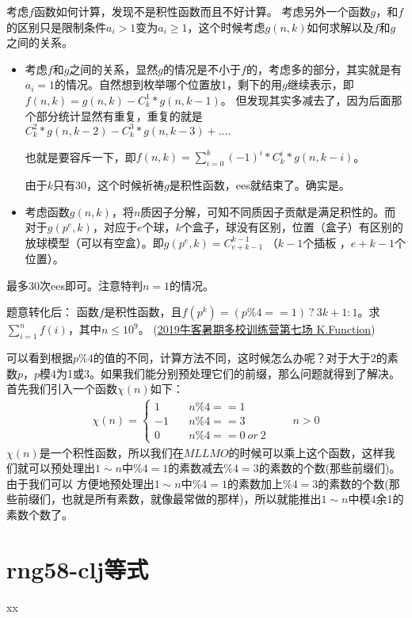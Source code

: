 \begin{solution}
	考虑$f$函数如何计算，发现不是积性函数而且不好计算。
	考虑另外一个函数$g$，和$f$的区别只是限制条件$a_i>1$变为$a_i\ge 1$，这个时候考虑$g(n,k)$如何求解以及$f$和$g$之间的关系。
	\begin{itemize}
		\item 考虑$f$和$g$之间的关系，显然$g$的情况是不小于$f$的，考虑多的部分，其实就是有$a_i=1$的情况。自然想到枚举哪个位置放1，剩下的用$g$继续表示，即$f(n,k) = g(n,k) - C_k^1*g(n,k-1)$。 但发现其实多减去了，因为后面那个部分统计显然有重复，重复的就是$C_k^2*g(n,k-2) - C_k^3*g(n,k-3)+....$   
		
		也就是要容斥一下，即$f(n,k) = \sum_{i=0}^k(-1)^i*C_k^i*g(n,k-i)$。  
		
		由于$k$只有30，这个时候祈祷$g$是积性函数，ees就结束了。确实是。
		\item 考虑函数$g(n,k)$，将$n$质因子分解，可知{\heiti 不同质因子贡献是满足积性的}。而对于$g(p^e,k)$，对应于$e$个球，$k$个盒子，球没有区别，位置（盒子）有区别的放球模型（可以有空盒）。即$g(p^e,k) = C_{e+k-1}^{k-1}$  （$k-1$个插板 ，$e+k-1$个位置）。
	\end{itemize}
	
	最多30次ees即可。注意特判$n=1$的情况。
\end{solution}



\vbox{}

\begin{example}
	题意转化后：
	函数$f$是积性函数，且$f(p^k) = (p\%4==1) \ ?\ 3k+1 : 1$。求$\sum_{i=1}^n f(i)$，其中$n\le 10^9$。
	(\href{https://ac.nowcoder.com/acm/contest/887/K}{2019牛客暑期多校训练营第七场 K.Function})
\end{example}

\begin{solution}
可以看到根据$p\%4$的值的不同，计算方法不同，这时候怎么办呢？对于大于$2$的素数$p$，$p$模4为1或3。如果我们能分别预处理它们的前缀，那么问题就得到了解决。
首先我们引入一个函数$\chi(n)$如下：
\begin{align*}
\chi(n) = \left\{\begin{matrix}
1&  \quad  n\%4==1\\
-1  & \quad  n\%4==3 \\
0 &\quad   n\%4==0\ or\ 2
\end{matrix}\right. \quad\quad n>0
\end{align*}
$\chi(n)$是一个积性函数，所以我们在$MLLMO$的时候可以乘上这个函数，这样我们就可以预处理出$1\sim n$中$\%4=1$的素数减去$\%4=3$的素数的个数(那些前缀们)。由于我们可以
方便地预处理出$1\sim n$中$\%4=1$的素数加上$\%4=3$的素数的个数(那些前缀们，也就是所有素数，就像最常做的那样)，所以就能推出$1\sim n$中模4余1的素数个数了。
\end{solution}





\section{rng58-clj等式}



\begin{problemset}
	\item xx
\end{problemset}